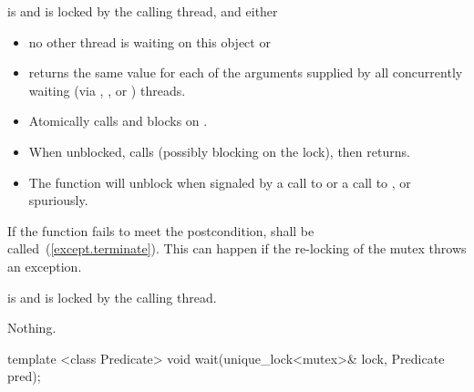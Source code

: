 \begin{itemdescr}
\pnum
\precondition {} is  and 
is locked by the calling thread, and either
\begin{itemize}
\item no other thread is waiting on this  object or
\item {} returns the same value for each of the 
arguments supplied by all concurrently waiting (via ,
, or ) threads.
\end{itemize}

\pnum\effects
\begin{itemize}
\item Atomically calls  and blocks on .
\item When unblocked, calls  (possibly blocking on the lock), then returns.
\item The function will unblock when signaled by a call to 
or a call to , or spuriously.
\end{itemize}

\pnum
\notes
If the function fails to meet the postcondition, 
shall be called~(\ref{except.terminate}).
\enternote This can happen if the re-locking of the mutex throws an exception. \exitnote

\pnum
\postcondition {} is  and 
is locked by the calling thread.

\pnum\throws Nothing.

\end{itemdescr}

%
%
\begin{itemdecl}
template <class Predicate>
  void wait(unique_lock<mutex>& lock, Predicate pred);
\end{itemdecl}

